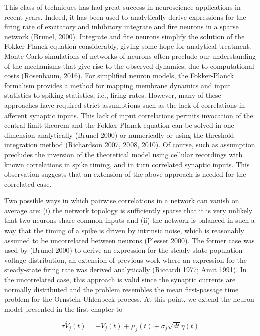 \documentclass{ucetd}
\begin{document}
This class of techniques has had great success in neuroscience applications in recent years. Indeed, it has been used to analytically derive expressions for the firing rate of excitatory and inhibitory integrate and fire neurons in a sparse network (Brunel, 2000). Integrate and fire neurons simplify the solution of the Fokker-Planck equation considerably, giving some hope for analytical treatment. Monte Carlo simulations of networks of neurons often preclude our understanding of the mechanisms that give rise to the observed dynamics, due to computational costs (Rosenbaum, 2016). For simplified neuron models, the Fokker-Planck formalism provides a method for mapping membrane dynamics and input statistics to spiking statistics, i.e., firing rates. However, many of these approaches have required strict assumptions such as the lack of correlations in afferent synaptic inputs. This lack of input correlations permits invocation of the central limit theorem and the Fokker Planck equation can be solved in one dimension analytically (Brunel 2000) or numerically or using the threshold integration method (Richardson 2007, 2008, 2010). Of course, such as assumption precludes the inversion of the theoretical model using cellular recordings with known correlations in spike timing, and in turn correlated synaptic inputs. This observation suggests that an extension of the above approach is needed for the correlated case.

Two possible ways in which pairwise correlations in a network can vanish on average are: (i) the network topology is sufficiently sparse that it is very unlikely that two neurons share common inputs and (ii) the network is balanced in such a way that the timing of a spike is driven by intrinsic noise, which is reasonably assumed to be uncorrelated between neurons (Plesser 2000). The former case was used by (Brunel 2000) to derive an expression for the steady state population voltage distribution, an extension of previous work where an expression for the steady-state firing rate was derived analytically (Riccardi 1977; Amit 1991). In the uncorrelated case, this approach is valid since the synaptic currents are normally distributed and the problem resembles the mean first-passage time problem for the Ornstein-Uhlenbeck process. At this point, we extend the neuron model presented in the first chapter to 

\begin{equation}
\tau\dot{V_{j}}(t) = -V_{j}(t) + \mu_{j}(t) + \sigma_{j}\sqrt{dt}\eta(t)
\end{equation}
\end{document}
